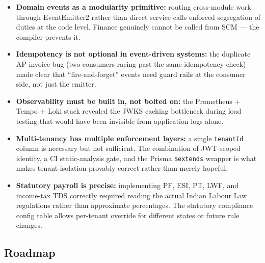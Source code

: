 \documentclass[11pt,a4paper]{article}
\newcommand{\code}[1]{\texttt{\small #1}}
\begin{document}
\begin{itemize}
  \item \textbf{Domain events as a modularity primitive:} routing cross-module work
  through EventEmitter2 rather than direct service calls enforced segregation of duties
  at the code level. Finance genuinely cannot be called from SCM --- the compiler
  prevents it.
  \item \textbf{Idempotency is not optional in event-driven systems:} the duplicate
  AP-invoice bug (two consumers racing past the same idempotency check) made clear
  that ``fire-and-forget'' events need guard rails at the consumer side, not just
  the emitter.
  \item \textbf{Observability must be built in, not bolted on:} the Prometheus + Tempo
  + Loki stack revealed the JWKS caching bottleneck during load testing that would
  have been invisible from application logs alone.
  \item \textbf{Multi-tenancy has multiple enforcement layers:} a single
  \code{tenantId} column is necessary but not sufficient. The combination of JWT-scoped
  identity, a CI static-analysis gate, and the Prisma \code{\$extends} wrapper is what
  makes tenant isolation provably correct rather than merely hopeful.
  \item \textbf{Statutory payroll is precise:} implementing PF, ESI, PT, LWF, and
  income-tax TDS correctly required reading the actual Indian Labour Law regulations
  rather than approximate percentages. The statutory compliance config table allows
  per-tenant override for different states or future rule changes.
\end{itemize}

\subsection{Roadmap}
\end{document}
